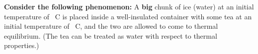 

\noindent\textbf{Consider the following phenomenon:} A \textbf{big} chunk of ice (water) at an initial temperature of  \unit[-65]{\textdegree C} is placed inside a well-insulated container with some tea at an initial temperature of \unit[20]{\textdegree C}, and the two are allowed to come to thermal equilibrium. (The tea can be treated as water with respect to thermal properties.)

